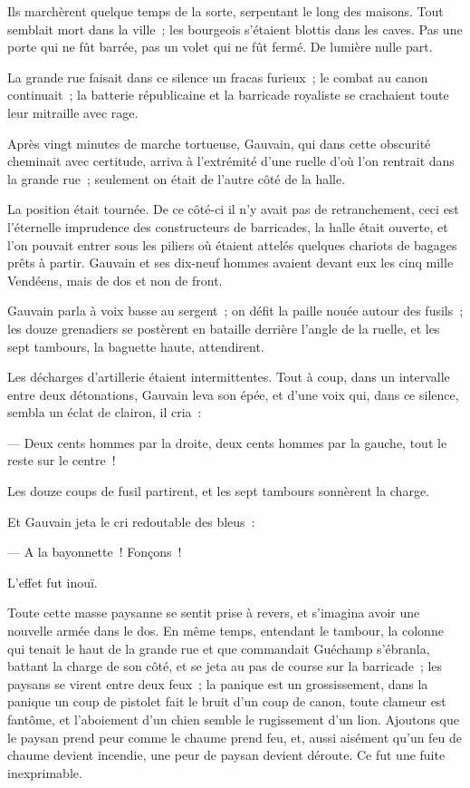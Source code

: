 \documentclass[french,twoside]{book} %
\begin{document}
Ils marchèrent quelque temps de la sorte, serpentant le long des maisons. Tout semblait mort dans la ville ; les bourgeois s’étaient blottis dans les caves. Pas une porte qui ne fût barrée, pas un volet qui ne fût fermé. De lumière nulle part.\par
La grande rue faisait dans ce silence un fracas furieux ; le combat au canon continuait ; la batterie  républicaine et la barricade royaliste se crachaient toute leur mitraille avec rage.\par
Après vingt minutes de marche tortueuse, Gauvain, qui dans cette obscurité cheminait avec certitude, arriva à l’extrémité d’une ruelle d’où l’on rentrait dans la grande rue ; seulement on était de l’autre côté de la halle.\par
La position était tournée. De ce côté-ci il n’y avait pas de retranchement, ceci est l’éternelle imprudence des constructeurs de barricades, la halle était ouverte, et l’on pouvait entrer sous les piliers où étaient attelés quelques chariots de bagages prêts à partir. Gauvain et ses dix-neuf hommes avaient devant eux les cinq mille Vendéens, mais de dos et non de front.\par
Gauvain parla à voix basse au sergent ; on défit la paille nouée autour des fusils ; les douze grenadiers se postèrent en bataille derrière l’angle de la ruelle, et les sept tambours, la baguette haute, attendirent.\par
Les décharges d’artillerie étaient intermittentes. Tout à coup, dans un intervalle entre deux détonations, Gauvain leva son épée, et d’une voix qui, dans ce silence, sembla un éclat de clairon, il cria :\par
— Deux cents hommes par la droite, deux cents hommes par la gauche, tout le reste sur le centre !\par
Les douze coups de fusil partirent, et les sept tambours sonnèrent la charge.\par
Et Gauvain jeta le cri redoutable des bleus :\par
— A la bayonnette ! Fonçons !\par
L’effet fut inouï.\par
 Toute cette masse paysanne se sentit prise à revers, et s’imagina avoir une nouvelle armée dans le dos. En même temps, entendant le tambour, la colonne qui tenait le haut de la grande rue et que commandait Guéchamp s’ébranla, battant la charge de son côté, et se jeta au pas de course sur la barricade ; les paysans se virent entre deux feux ; la panique est un grossissement, dans la panique un coup de pistolet fait le bruit d’un coup de canon, toute clameur est fantôme, et l’aboiement d’un chien semble le rugissement d’un lion. Ajoutons que le paysan prend peur comme le chaume prend feu, et, aussi aisément qu’un feu de chaume devient incendie, une peur de paysan devient déroute. Ce fut une fuite inexprimable.\par
\end{document}
